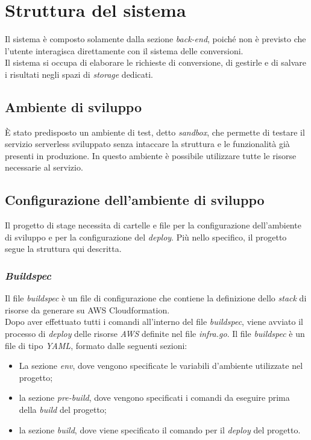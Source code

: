 \section{Struttura del sistema}

Il sistema è composto solamente dalla sezione \emph{back-end}, poiché
non è previsto che l'utente interagisca direttamente con il sistema delle
conversioni. \\
Il sistema si occupa di elaborare le richieste di conversione, di gestirle e di
salvare i risultati negli spazi di \emph{storage} dedicati.

\subsection{Ambiente di sviluppo}

È stato predisposto un ambiente di test, detto \emph{sandbox}, che permette di
testare il servizio serverless sviluppato senza intaccare la struttura e le
funzionalità già presenti in produzione. In questo ambiente è possibile
utilizzare tutte le risorse necessarie al servizio.

\subsection{Configurazione dell'ambiente di sviluppo}

Il progetto di stage necessita di cartelle e file per la configurazione
dell'ambiente di sviluppo e per la configurazione del \emph{deploy}. Più nello
specifico, il progetto segue la struttura qui descritta.

\subsubsection*{\emph{Buildspec}}

Il file \emph{buildspec} è un file di configurazione che contiene la definizione
dello \emph{stack} di risorse da generare su \glsfirstoccur\gls{AWS
      Cloudformation}. \\
Dopo aver effettuato tutti i comandi all'interno del file \emph{buildspec},
viene avviato il processo di \emph{deploy} delle risorse \emph{AWS} definite nel
file \emph{infra.go}. Il file \emph{buildspec} è un file di tipo \emph{YAML},
formato dalle seguenti sezioni:
\begin{itemize}
      \item La sezione \emph{env}, dove vengono specificate le variabili
            d'ambiente utilizzate nel progetto;
      \item la sezione \emph{pre-build}, dove vengono specificati i comandi da
            eseguire prima della \emph{build} del progetto;
      \item la sezione \emph{build}, dove viene specificato il comando per il
            \emph{deploy} del progetto.
\end{itemize}

